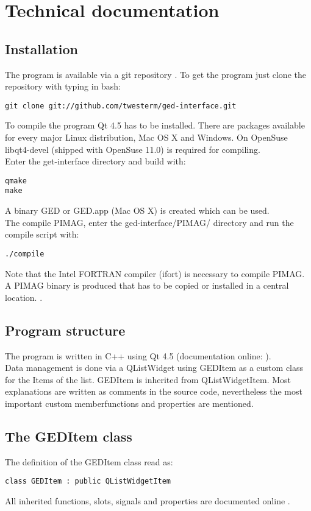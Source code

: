 \section{Technical documentation}\label{tech}
\subsection{Installation}
The program is available via a git repository \cite{git}. To get the program just clone the repository with typing in bash: 
\begin{lstlisting}
git clone git://github.com/twesterm/ged-interface.git
\end{lstlisting}
To compile the program Qt 4.5 \cite{qt} has to be installed. There are packages available for every major Linux distribution, Mac OS X and Windows. On OpenSuse \cite{opensuse} libqt4-devel (shipped with OpenSuse 11.0)  is required for compiling. \\
Enter the get-interface directory and build with: 
\begin{lstlisting}
qmake
make
\end{lstlisting}
A binary GED or GED.app (Mac OS X) is created which can be used. \\
The compile PIMAG, enter the ged-interface/PIMAG/ directory and run the compile script with: 
\begin{lstlisting}
./compile
\end{lstlisting}
Note that the Intel FORTRAN compiler (ifort) \cite{ifort}  is necessary to compile PIMAG. A PIMAG binary is produced that has to be copied or installed in a central location. . 

\subsection{Program structure}
The program is written in C++ using Qt 4.5 (documentation online: \cite{qt}).\\
 Data management is done via a QListWidget using GEDItem as a custom class for the Items of the list. GEDItem is inherited from QListWidgetItem. Most explanations are written as comments in the source code, nevertheless the most important custom memberfunctions and properties are mentioned. \\
 
 
\subsection{The GEDItem class}
The definition of the GEDItem class read as: 
\begin{lstlisting}
class GEDItem : public QListWidgetItem
\end{lstlisting}
All inherited functions, slots, signals and properties are documented online \cite{qt}.     \\
